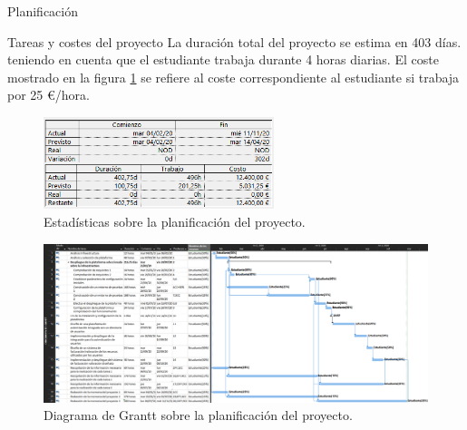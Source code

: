 \begin{chapter}{Planificación}
\begin{section}{Tareas y costes del proyecto}
La duración total del proyecto se estima en 403 días. teniendo en cuenta que el estudiante trabaja durante 4 horas diarias. El coste mostrado en la figura \ref{fig:estadisticasproyecto} se refiere al coste correspondiente al estudiante si trabaja por 25 €/hora. 
\begin{figure}[h!]
  \centering
  \includegraphics[width=0.6\textwidth]{imaxes/extras/estadisticasProyecto.png}
  \caption{Estadísticas sobre la planificación del proyecto.}
  \label{fig:estadisticasproyecto}
\end{figure}
\FloatBarrier
\begin{landscape}
\begin{figure}[hp]
  \centering
  \includegraphics[width=1.5\textwidth]{imaxes/extras/diagramaGranttt.png}
  \caption{Diagrama de Grantt sobre la planificación del proyecto.}
  \label{fig:tareasproyecto}
\end{figure}
\end{landscape}
\FloatBarrier
\end{section}


\end{chapter}
